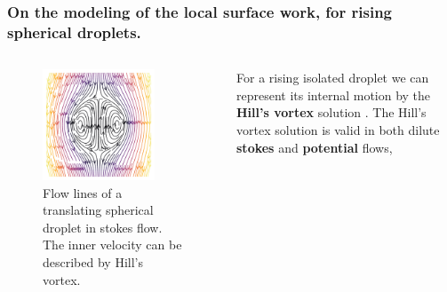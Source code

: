 \documentclass{sintefbeamer}
\begin{document}
\begin{frame}
  \frametitle{On the modeling of the local surface work, for rising spherical droplets. }

  \begin{columns}
    \begin{figure}
      \includegraphics[width=0.8\textwidth]{image/Rising_Stokes.png}
      \caption{Flow lines of a translating spherical droplet in stokes flow.
      The inner velocity can be described by Hill's vortex. }
    \end{figure}
    For a rising isolated droplet we can represent its internal motion by the \textbf{Hill's vortex} solution \citep{kim2013microhydrodynamics}. 
\vspace{1cm}
    The Hill's vortex solution is valid in both dilute \textbf{stokes} and \textbf{potential} flows, 
    

\end{columns}
\end{frame}
\end{document}
